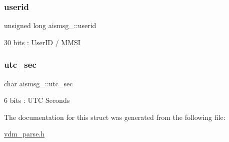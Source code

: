 \subsubsection{\texorpdfstring{userid}{userid}}
{\footnotesize\ttfamily unsigned long aismsg\+\_\+::userid}



30 bits \+: User\+ID / M\+M\+SI 

\mbox{\label{structaismsg__3_a8312635e0041843ce9e2d0e96bcf1cfd}} 
\subsubsection{\texorpdfstring{utc\+\_\+sec}{utc\_sec}}
{\footnotesize\ttfamily char aismsg\+\_\+::utc\+\_\+sec}



6 bits \+: U\+TC Seconds 



The documentation for this struct was generated from the following file\+:\begin{DoxyCompactItemize}
\item 
\mbox{\hyperlink{vdm__parse_8h}{vdm\+\_\+parse.\+h}}\end{DoxyCompactItemize}
